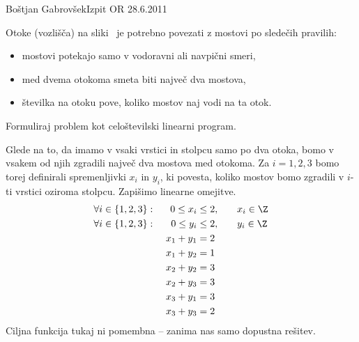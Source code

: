 \begin{naloga}{Boštjan Gabrovšek}{Izpit OR 28.6.2011}
\begin{vprasanje}
Otoke (vozlišča) na sliki~\fig
je potrebno povezati z mostovi po sledečih pravilih:
\begin{itemize}
\item mostovi potekajo samo v vodoravni ali navpični smeri,
\item med dvema otokoma smeta biti največ dva mostova,
\item številka na otoku pove, koliko mostov naj vodi na ta otok.
\end{itemize}
Formuliraj problem kot celoštevilski linearni program.

\begin{slika}
\pgfslika
{}
\end{slika}
\end{vprasanje}

\begin{odgovor}
Glede na to, da imamo v vsaki vrstici in stolpcu samo po dva otoka,
bomo v vsakem od njih zgradili največ dva mostova med otokoma.
Za $i = 1, 2, 3$ bomo torej definirali spremenljivki $x_i$ in $y_i$,
ki povesta, koliko mostov bomo zgradili v $i$-ti vrstici oziroma stolpcu.
Zapišimo linearne omejitve.
\begin{alignat*}{3}
\forall i \in \{1, 2, 3\}: &\ & 0 \le x_i &\le 2, &\quad& x_i \in \Z \\
\forall i \in \{1, 2, 3\}: &\ & 0 \le y_i &\le 2, &\quad& y_i \in \Z \\
&& x_1 + y_1 &= 2 \\
&& x_1 + y_2 &= 1 \\
&& x_2 + y_2 &= 3 \\
&& x_2 + y_3 &= 3 \\
&& x_3 + y_1 &= 3 \\
&& x_3 + y_3 &= 2
\end{alignat*}
Ciljna funkcija tukaj ni pomembna -- zanima nas samo dopustna rešitev.
\end{odgovor}
\end{naloga}
